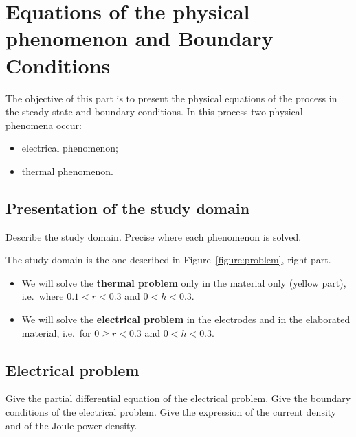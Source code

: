 \documentclass{article}
\begin{document}
\section{Equations of the physical phenomenon and Boundary Conditions}
The objective of this part is to present the physical equations of the process in the steady state and boundary conditions. In this process two physical phenomena occur:
\begin{itemize}
	\item electrical phenomenon;
	\item thermal phenomenon.
\end{itemize}
\subsection{Presentation of the study domain}
Describe the study domain. Precise where each phenomenon is solved.
\begin{mdframed}
	The study domain is the one described in Figure~\ref{figure:problem}, right part. 
	\begin{itemize}
		\item We will solve the \textbf{thermal problem} only in the material only (yellow part), i.e.~where $ 0.1<r<0.3 $ and $ 0<h<0.3 $.
		\item We will solve the \textbf{electrical problem} in the electrodes and in the elaborated material, i.e.~for $ 0\geq r<0.3 $ and $ 0<h<0.3 $.  
	\end{itemize} 
\end{mdframed}
\subsection{Electrical problem}
Give the partial differential equation of the electrical problem.
Give the boundary conditions of the electrical problem.
Give the expression of the current density and of the Joule power density.
\begin{mdframed}
	
\end{mdframed}
\end{document}
